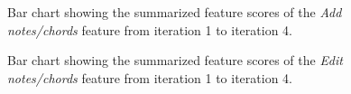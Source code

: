 		\begin{figure}[H]
			\centering
		    \caption{Bar chart showing the summarized feature scores of the \textit{Add notes/chords} feature from iteration 1 to iteration 4.}
		    \label{fig:add-bar}
		\end{figure} 

		\begin{figure}[H]
			\centering
		    \caption{Bar chart showing the summarized feature scores of the \textit{Edit notes/chords} feature from iteration 1 to iteration 4.}
		    \label{fig:edit-bar}
		\end{figure} 


